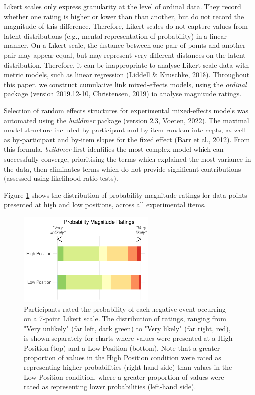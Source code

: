 \documentclass[journal]{vgtc}                %
\begin{document}
Likert scales only express granularity at the level of ordinal data. They record whether one rating is higher or lower than than another, but do not record the magnitude of this difference. Therefore, Likert scales do not capture values from latent distributions (e.g., mental representation of probability) in a linear manner. On a Likert scale, the distance between one pair of points and another pair may appear equal, but may represent very different distances on the latent distribution. Therefore, it can be inappropriate to analyse Likert scale data with metric models, such as linear regression (Liddell \& Kruschke, 2018). Throughout this paper, we construct cumulative link mixed-effects models, using the \emph{ordinal} package (version 2019.12-10, Christensen, 2019) to analyse magnitude ratings.

Selection of random effects structures for experimental mixed-effects models was automated using the \emph{buildmer} package (version 2.3, Voeten, 2022). The maximal model structure included by-participant and by-item random intercepts, as well as by-participant and by-item slopes for the fixed effect (Barr et al., 2012). From this formula, \emph{buildmer} first identifies the most complex model which can successfully converge, prioritising the terms which explained the most variance in the data, then eliminates terms which do not provide significant contributions (assessed using likelihood ratio tests).

Figure \ref{fig:r1-c-plot} shows the distribution of probability magnitude ratings for data points presented at high and low positions, across all experimental items.

\begin{figure}
\includegraphics[width=250px]{position_magnitude_files/figure-latex/r1-c-plot-1} \caption{Participants rated the probability of each negative event occurring on a 7-point Likert scale. The distribution of ratings, ranging from "Very unlikely" (far left, dark green) to "Very likely" (far right, red), is shown separately for charts where values were presented at a High Position (top) and a Low Position (bottom). Note that a greater proportion of values in the High Position condition were rated as representing higher probabilities (right-hand side) than values in the Low Position condition, where a greater proportion of values were rated as representing lower probabilities (left-hand side).}\label{fig:r1-c-plot}
\end{figure}
\end{document}
